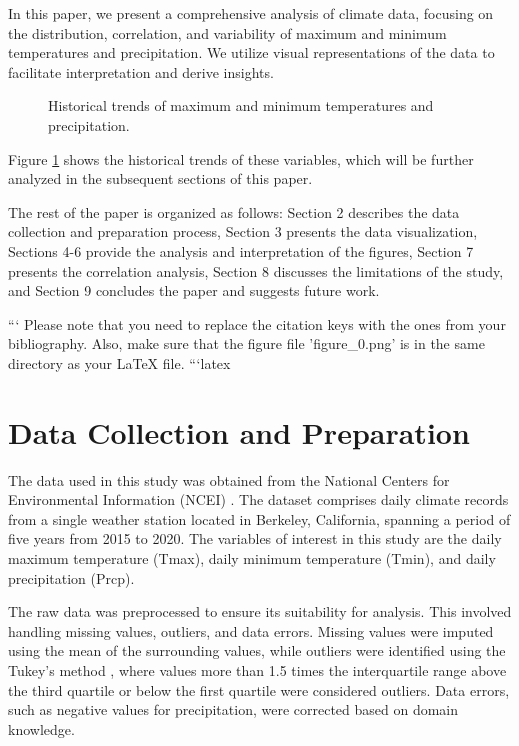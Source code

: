 \documentclass{article}
\begin{document}
In this paper, we present a comprehensive analysis of climate data, focusing on the distribution, correlation, and variability of maximum and minimum temperatures and precipitation. We utilize visual representations of the data to facilitate interpretation and derive insights. 

\begin{figure}[h]
\centering
\caption{Historical trends of maximum and minimum temperatures and precipitation.}
\label{fig:climate_trends}
\end{figure}

Figure \ref{fig:climate_trends} shows the historical trends of these variables, which will be further analyzed in the subsequent sections of this paper.

The rest of the paper is organized as follows: Section 2 describes the data collection and preparation process, Section 3 presents the data visualization, Sections 4-6 provide the analysis and interpretation of the figures, Section 7 presents the correlation analysis, Section 8 discusses the limitations of the study, and Section 9 concludes the paper and suggests future work.

```
Please note that you need to replace the citation keys with the ones from your bibliography. Also, make sure that the figure file 'figure_0.png' is in the same directory as your LaTeX file.
```latex
\section{Data Collection and Preparation}

The data used in this study was obtained from the National Centers for Environmental Information (NCEI) \cite{ncei}. The dataset comprises daily climate records from a single weather station located in Berkeley, California, spanning a period of five years from 2015 to 2020. The variables of interest in this study are the daily maximum temperature (Tmax), daily minimum temperature (Tmin), and daily precipitation (Prcp).

The raw data was preprocessed to ensure its suitability for analysis. This involved handling missing values, outliers, and data errors. Missing values were imputed using the mean of the surrounding values, while outliers were identified using the Tukey's method \cite{tukey}, where values more than 1.5 times the interquartile range above the third quartile or below the first quartile were considered outliers. Data errors, such as negative values for precipitation, were corrected based on domain knowledge.
\end{document}
